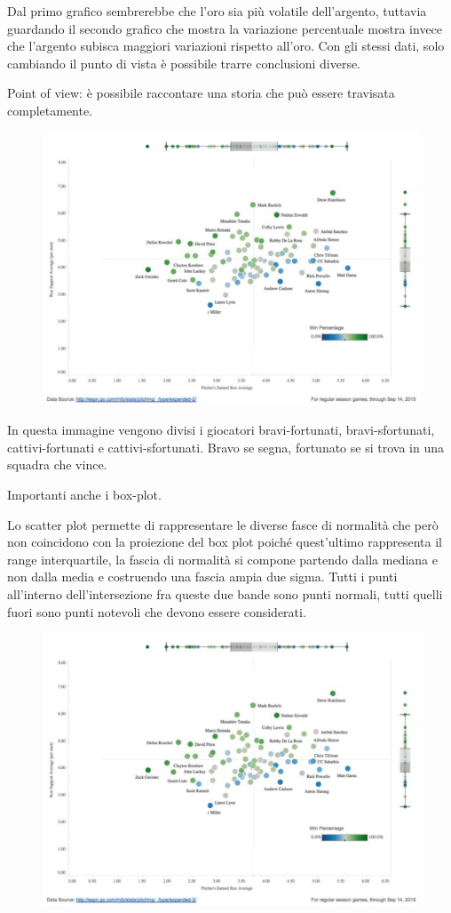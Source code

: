 \documentclass[12pt,a4paper]{report}
\begin{document}
Dal primo grafico sembrerebbe che l'oro sia più volatile dell'argento, tuttavia guardando il secondo grafico che mostra la variazione percentuale mostra invece che l'argento subisca maggiori variazioni rispetto all'oro. Con gli stessi dati, solo cambiando il punto di vista è possibile trarre conclusioni diverse. 

Point of view: è possibile raccontare una storia che può essere travisata completamente. 

\begin{figure}[h]
	\centering
	\includegraphics[width=.5\textwidth]{imgs datavis/scatter plot.png}\hfil
	
	\caption{}\label{}
\end{figure}

In questa immagine vengono divisi i giocatori bravi-fortunati, bravi-sfortunati, cattivi-fortunati e cattivi-sfortunati. Bravo se segna, fortunato se si trova in una squadra che vince. 

Importanti anche i box-plot.

Lo scatter plot permette di rappresentare le diverse fasce di normalità che però non coincidono con la proiezione del box plot poiché quest'ultimo rappresenta il range interquartile, la fascia di normalità si compone partendo dalla mediana e non dalla media e costruendo una fascia ampia due sigma. Tutti i punti all'interno dell'intersezione fra queste due bande sono punti normali, tutti quelli fuori sono punti notevoli che devono essere considerati. 

\begin{figure}[h]
	\centering
	\includegraphics[width=.5\textwidth]{imgs datavis/scatter plot.png}\hfil
	
	\caption{}\label{scatter plot}
\end{figure}
\end{document}
